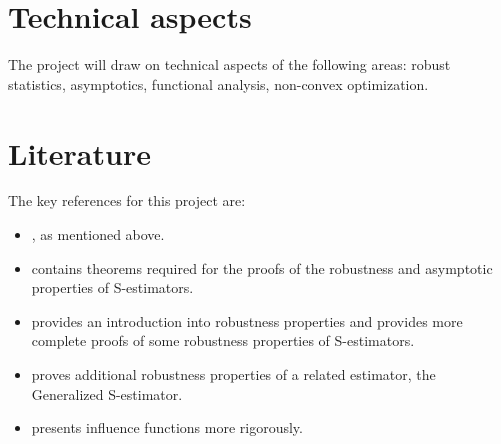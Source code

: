 \documentclass[]{STAT_547C}
\begin{document}
\section{Technical aspects}

The project will draw on technical aspects of the following areas: robust statistics, asymptotics, functional analysis, non-convex optimization.



\section{Literature}

The key references for this project are:

\begin{itemize}
  \item \cite{rousseeuw1984robust}, as mentioned above.
  \item \cite{rousseeuw1984least} contains theorems required for the proofs of the robustness and asymptotic properties of S-estimators.
  \item \cite[Ch.~3]{maronna2019robust} provides an introduction into robustness properties and \cite[Ch.~5]{maronna2019robust} provides more complete proofs of some robustness properties of S-estimators.
  \item \cite{croux1994generalized} proves additional robustness properties of a related estimator, the Generalized S-estimator.
  \item \cite[Ch.~2]{hampel2011robust} presents influence functions more rigorously.
  
\end{itemize}
\end{document}
